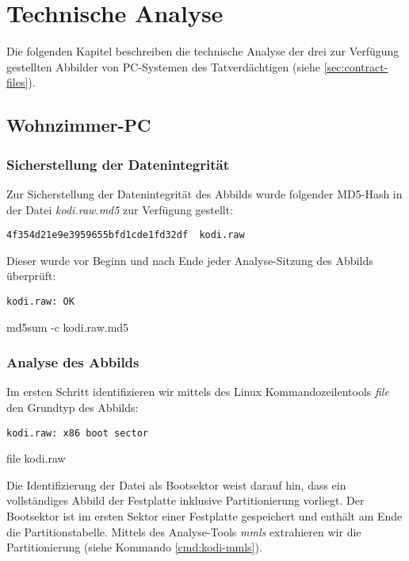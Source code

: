 \chapter{Technische Analyse}
\label{chap:analysis}

Die folgenden Kapitel beschreiben die technische Analyse der drei zur Verfügung gestellten Abbilder von PC-Systemen des Tatverdächtigen (siehe \autoref{sec:contract-files}).

\section{Wohnzimmer-PC}

\subsection{Sicherstellung der Datenintegrität}
\label{sec:kodi-integrity}

Zur Sicherstellung der Datenintegrität des Abbilds wurde folgender MD5-Hash in der Datei \textit{kodi.raw.md5} zur Verfügung gestellt:

\begin{verbatim}
4f354d21e9e3959655bfd1cde1fd32df  kodi.raw
\end{verbatim}

Dieser wurde vor Beginn und nach Ende jeder Analyse-Sitzung des Abbilds überprüft:

\begin{cmd}
\begin{verbatim}
kodi.raw: OK
\end{verbatim}
\caption{md5sum -c kodi.raw.md5}
\end{cmd}

\subsection{Analyse des Abbilds}
\label{sec:kodi-rawanalysis}

Im ersten Schritt identifizieren wir mittels des Linux Kommandozeilentools \textit{file} den Grundtyp des Abbilds:

\begin{cmd}
\begin{verbatim}
kodi.raw: x86 boot sector
\end{verbatim}
\caption{file kodi.raw}
\end{cmd}

Die Identifizierung der Datei als Bootsektor weist darauf hin, dass ein vollständiges Abbild der Festplatte inklusive Partitionierung vorliegt. Der Bootsektor ist im ersten Sektor einer Festplatte gespeichert und enthält am Ende die Partitionstabelle. Mittels des Analyse-Tools \textit{mmls} extrahieren wir die Partitionierung (siehe Kommando \autoref{cmd:kodi-mmls}).

